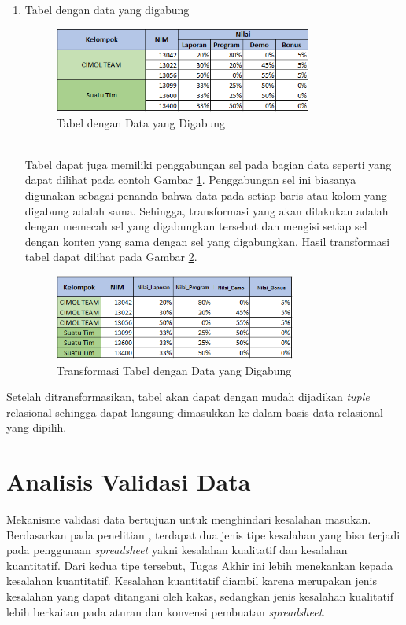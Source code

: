 \begin{enumerate}
	\item Tabel dengan data yang digabung
	\begin{figure}[htbp]
	    \centering
	    \includegraphics[width=0.8\textwidth]{resources/chapter-3-tabletype-4.png}
	    \caption{Tabel dengan Data yang Digabung}
		\label{TabelTipe4}
	\end{figure}\\
	Tabel dapat juga memiliki penggabungan sel pada bagian data seperti yang dapat dilihat pada contoh Gambar \ref{TabelTipe4}. Penggabungan sel ini biasanya digunakan sebagai penanda bahwa data pada setiap baris atau kolom yang digabung adalah sama. Sehingga, transformasi yang akan dilakukan adalah dengan memecah sel yang digabungkan tersebut dan mengisi setiap sel dengan konten yang sama dengan sel yang digabungkan. Hasil transformasi tabel dapat dilihat pada Gambar \ref{TabelTipe4T}.\\
	\begin{figure}[htbp]
	    \centering
	    \includegraphics[width=0.75\textwidth]{resources/chapter-3-tabletype-4-transformed.png}
	    \caption{Transformasi Tabel dengan Data yang Digabung}
		\label{TabelTipe4T}
	\end{figure}
\end{enumerate}
Setelah ditransformasikan, tabel akan dapat dengan mudah dijadikan \textit{tuple} relasional sehingga dapat langsung dimasukkan ke dalam basis data relasional yang dipilih.

\section{Analisis Validasi Data}
Mekanisme validasi data bertujuan untuk menghindari kesalahan masukan. Berdasarkan pada penelitian \citep{Panko1998}, terdapat dua jenis tipe kesalahan yang bisa terjadi pada penggunaan \textit{spreadsheet} yakni kesalahan kualitatif dan kesalahan kuantitatif. Dari kedua tipe tersebut, Tugas Akhir ini lebih menekankan kepada kesalahan kuantitatif. Kesalahan kuantitatif diambil karena merupakan jenis kesalahan yang dapat ditangani oleh kakas, sedangkan jenis kesalahan kualitatif lebih berkaitan pada aturan dan konvensi pembuatan \textit{spreadsheet}.


